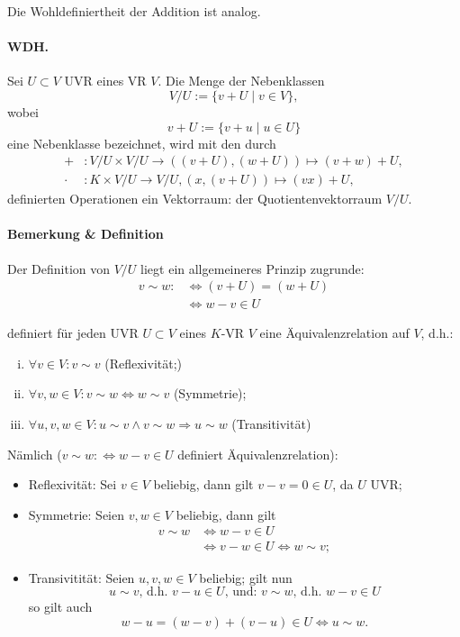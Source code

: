 	Die Wohldefiniertheit der Addition ist analog.


\paragraph{WDH.}
	Sei $ U\subset V $ UVR eines VR $ V $. Die Menge der Nebenklassen
		\[ V/U := \{v+U\mid v\in V\}, \]
	wobei
		\[ v+U := \{v+u\mid u\in U\} \]
	eine Nebenklasse bezeichnet, wird mit den durch
		\begin{align*}
		+&: V/U \times V/U \to ((v+U),(w+U))\mapsto (v+w)+U,\\
		\cdot &: K\times V/U \to V/U, (x,(v+U))\mapsto (vx)+U,
		\end{align*}
	definierten Operationen ein Vektorraum: der Quotientenvektorraum $ V/U $.
	
\paragraph{Bemerkung \& Definition}
	Der Definition von $ V/U $ liegt ein allgemeineres Prinzip zugrunde:
		\begin{align*}
		v\sim w :	&\Leftrightarrow (v+U)= (w+U)\\
					&\Leftrightarrow w-v \in U
		\end{align*}
	
	definiert für jeden UVR $ U\subset V $ eines $ K $-VR $ V $ eine Äquivalenzrelation auf $ V $, d.h.:
		\begin{enumerate}[(i)]
			\item $ \forall v\in V: v\sim v $ (Reflexivität;)
			\item $ \forall v,w\in V: v\sim w\Leftrightarrow w\sim v $ (Symmetrie);
			\item $ \forall u,v,w\in V: u\sim v\land v\sim w\Rightarrow u\sim w $ (Transitivität)
		\end{enumerate}
		
	Nämlich ($ v\sim w:\Leftrightarrow w-v\in U $ definiert Äquivalenzrelation):
	
	\begin{itemize}
		\item Reflexivität: Sei $ v\in V $ beliebig, dann gilt $ v-v=0\in U $, da $ U $ UVR;
		\item Symmetrie: Seien $ v,w\in V $ beliebig, dann gilt
			\begin{align*}
			v\sim w 	&\Leftrightarrow w-v\in U\\
						&\Leftrightarrow v-w\in U \Leftrightarrow w\sim v;
			\end{align*}
		\item Transivitität: Seien $ u,v,w\in V $ beliebig; gilt nun
			\[  u\sim v \text{, d.h. } v-u\in U \text{, und: } v\sim w\text{, d.h. } w-v\in U\]
		so gilt auch
			\[ w-u=(w-v)+(v-u)\in U \Leftrightarrow u\sim w. \]
	\end{itemize}
	
